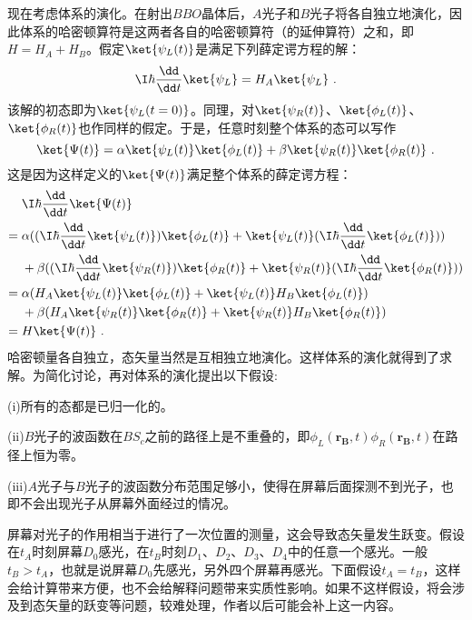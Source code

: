 现在考虑体系的演化。在射出$BBO$晶体后，$A$光子和$B$光子将各自独立地演化，因此体系的哈密顿算符是这两者各自的哈密顿算符（的延伸算符）之和，即$H=H_A+H_B$。假定$\ket{\psi_L(t)}$是满足下列薛定谔方程的解：
\begin{equation}
\I\hbar\frac{\dd}{\dd t}\ket{\psi_L} =H_A\ket{\psi_L}~.
\end{equation}
该解的初态即为$\ket{\psi_L(t=0)}$。同理，对$\ket{\psi_R(t)}$、$\ket{\phi_L(t)}$、$\ket{\phi_R(t)}$也作同样的假定。于是，任意时刻整个体系的态可以写作
\begin{equation}
\ket{\Psi(t)} =\alpha\ket{\psi_L(t)}\ket{\phi_L(t)}+\beta\ket{\psi_R(t)}\ket{\phi_R(t)}~.
\end{equation}
这是因为这样定义的$\ket{\Psi(t)}$满足整个体系的薛定谔方程：
\begin{align}
&\I\hbar\frac{\dd}{\dd t}\ket{\Psi(t)} \notag \\
={}&\alpha((\I\hbar\frac{\dd}{\dd t}\ket{\psi_L(t)})\ket{\phi_L(t)}+\ket{\psi_L(t)}(\I\hbar\frac{\dd}{\dd t}\ket{\phi_L(t)})) \notag \\
&+\beta((\I \hbar\frac{\dd}{\dd t}\ket{\psi_R(t)})\ket{\phi_R(t)}+\ket{\psi_R(t)}(\I\hbar\frac{\dd}{\dd t}\ket{\phi_R(t)})) \notag \\
={}&\alpha(H_A\ket{\psi_L(t)}\ket{\phi_L(t)}+\ket{\psi_L(t)} H_B\ket{\phi_L(t)}) \notag \\
&+\beta(H_A\ket{\psi_R(t)}\ket{\phi_R(t)}+\ket{\psi_R(t)} H_B\ket{\phi_R(t)}) \notag \\
={}&H\ket{\Psi(t)}~.
\end{align}
哈密顿量各自独立，态矢量当然是互相独立地演化。这样体系的演化就得到了求解。为简化讨论，再对体系的演化提出以下假设:

(i)所有的态都是已归一化的。

(ii)$B$光子的波函数在$BS_c$之前的路径上是不重叠的，即$\phi_L(\boldsymbol{r_B},t)\phi_R(\boldsymbol{r_B},t)$在路径上恒为零。

(iii)$A$光子与$B$光子的波函数分布范围足够小，使得在屏幕后面探测不到光子，也即不会出现光子从屏幕外面经过的情况。


屏幕对光子的作用相当于进行了一次位置的测量，这会导致态矢量发生跃变。假设在$t_A$时刻屏幕$D_0$感光，在$t_B$时刻$D_1$、$D_2$、$D_3$、$D_4$中的任意一个感光。一般$t_B>t_A$，也就是说屏幕$D_0$先感光，另外四个屏幕再感光。下面假设$t_A=t_B$，这样会给计算带来方便，也不会给解释问题带来实质性影响。如果不这样假设，将会涉及到态矢量的跃变等问题，较难处理，作者以后可能会补上这一内容。

